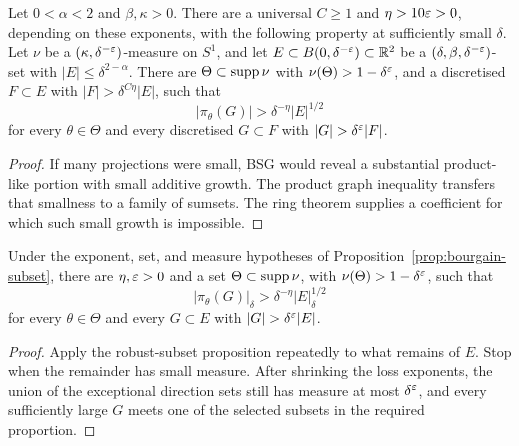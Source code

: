 \begin{proposition}
\label{prop:bourgain-subset}
Let $0<\alpha<2$ and $\beta,\kappa>0$. There are a universal
$C\geq1$ and $\eta>10\varepsilon>0$, depending on these exponents,
with the following property at sufficiently small $\delta$.
Let $\nu$ be a $(\kappa,\delta^{-\varepsilon})$-measure on $S^1$,
and let $E\subset B(0,\delta^{-\varepsilon})\subset\mathbb{R}^2$ be a
$(\delta,\beta,\delta^{-\varepsilon})$-set with
$|E|\leq\delta^{2-\alpha}$. There are
$\Theta\subset\operatorname{supp}\nu$ with $\nu(\Theta)>1-\delta^\varepsilon$,
and a discretised $F\subset E$ with $|F|>\delta^{C\eta}|E|$,
such that
\[
       |\pi_\theta(G)|>\delta^{-\eta}|E|^{1/2}
\]
for every $\theta\in\Theta$ and every discretised $G\subset F$
with $|G|>\delta^\eps|F|$.
\end{proposition}
\begin{proof}
If many projections were small, BSG would reveal a substantial
product-like portion with small additive growth. The product graph
inequality transfers that smallness to a family of sumsets. The ring
theorem supplies a coefficient for which such small growth is
impossible.
\end{proof}

\begin{theorem}
\label{thm:bourgain-projection}
Under the exponent, set, and measure hypotheses of
Proposition~\ref{prop:bourgain-subset}, there are $\eta,\varepsilon>0$
and a set $\Theta\subset\operatorname{supp}\nu$, with
$\nu(\Theta)>1-\delta^\varepsilon$, such that
\[
       |\pi_\theta(G)|_\delta>
                     \delta^{-\eta}|E|_\delta^{1/2}
\]
for every $\theta\in\Theta$ and every $G\subset E$ with
$|G|>\delta^\eps|E|$.
\end{theorem}
\begin{proof}
Apply the robust-subset proposition repeatedly to what remains of
$E$. Stop when the remainder has small measure. After shrinking
the loss exponents, the union of the exceptional direction sets
still has measure at most $\delta^\varepsilon$, and every sufficiently
large $G$ meets one of the selected subsets in the required proportion.
\end{proof}
